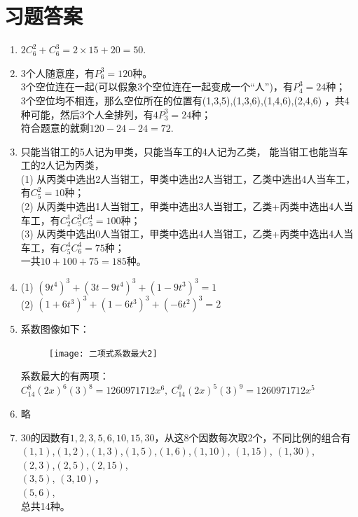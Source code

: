 \section{习题答案}
\begin{enumerate}[label={\textbf{\arabic*.}},leftmargin=
    \inteval{\myenumleftmargin}pt]
\item $ 2C_6^2+C_6^3=2\times 15+20=50 $.

\item 3个人随意座，有$ P_6^3=120 $种。\\
3个空位连在一起(可以假象3个空位连在一起变成一个“人”)，有$P_4^3=24$种；\\
3个空位均不相连，那么空位所在的位置有(1,3,5),(1,3,6),(1,4,6),(2,4,6)
，共4种可能，然后3个人全排列，有$4P_3^3=24$种；\\
符合题意的就剩$ 120-24-24=72$.

\item 只能当钳工的5人记为甲类，只能当车工的4人记为乙类，
能当钳工也能当车工的2人记为丙类，\\
(1) 从丙类中选出2人当钳工，甲类中选出2人当钳工，乙类中选出4人当车工，有$ C_5^2=10 $种；\\
(2) 从丙类中选出1人当钳工，甲类中选出3人当钳工，乙类+丙类中选出4人当车工，有$ C_2^1C_5^3C_5^4=100 $种；\\
(3) 从丙类中选出0人当钳工，甲类中选出4人当钳工，乙类+丙类中选出4人当车工，有$ C_5^4C_6^4=75 $种；\\
一共$10+100+75=185$种。

\item (1) $ \left(9t^4\right)^3+\left(3t-9t^4\right)^3+
\left(1-9t^3\right)^3=1 $ \\
(2) $ \left(1+6t^3\right)^3+\left(1-6t^3\right)^3+
\left(-6t^2\right)^3=2 $

\item 系数图像如下：
\begin{figure}[H]
    \centering
    \texttt{[image: 二项式系数最大2]}
\end{figure}
系数最大的有两项：$ C_{14}^{8}(2x)^6(3)^8=1260971712x^{6},\ 
C_{14}^{9}(2x)^5(3)^9=1260971712x^{5} $

\item 略

\item 30的因数有$ 1,2,3,5,6,10,15,30 $，从这8个因数每次取2个，不同比例的组合有\\
$ (1,1) $,$ (1,2) $,$ (1,3) $,$ (1,5) $,$ (1,6) $,$(1,10)$,
$ (1,15) $, $(1,30)$,\\
$ (2,3) $,$(2,5)$,$(2,15)$,\\
$ (3,5) $, $(3,10)$，\\
$ (5,6) $,\\
总共14种。


\end{enumerate}
